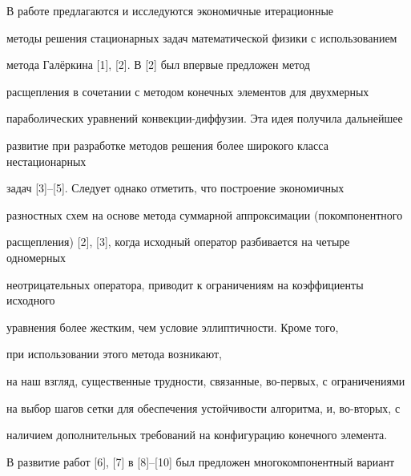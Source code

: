 \date{}




\pagestyle{plain} %







\maketitle


\label{begin}





В работе предлагаются и исследуются экономичные итерационные


методы решения стационарных задач математической физики с использованием


метода Гал\"еркина [1], [2]. В [2] был впервые предложен метод


расщепления в сочетании с методом конечных элементов для двухмерных


параболических уравнений конвекции-диффузии. Эта идея получила дальнейшее


развитие при разработке методов решения более широкого класса нестационарных


задач [3]--[5]. Следует однако отметить, что построение экономичных


разностных схем на основе метода суммарной аппроксимации (покомпонентного


расщепления) [2], [3], когда исходный оператор разбивается на четыре одномерных


неотрицательных оператора, приводит к ограничениям на коэффициенты исходного


уравнения более жестким, чем условие эллиптичности. Кроме того,


при использовании этого метода возникают,


на наш взгляд, существенные трудности, связанные, во-первых, с ограничениями


на выбор шагов сетки для обеспечения устойчивости алгоритма, и, во-вторых, с


наличием дополнительных требований на конфигурацию конечного элемента.





В развитие работ [6], [7] в [8]--[10] был предложен многокомпонентный вариант


